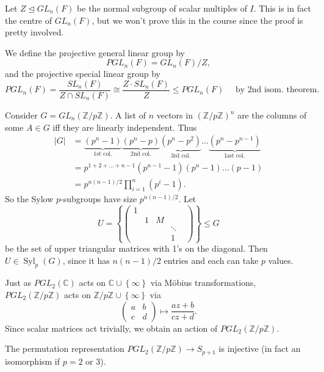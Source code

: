 \documentclass[a4paper]{scrartcl}
\begin{document}
Let $Z \unlhd GL_{n}(F)$ be the normal subgroup of scalar multiples of $I$. This is in fact the centre of $GL_{n}(F)$, but we won't prove this in the course since the proof is pretty involved.
\begin{definition*}
      We define the projective general linear group by \[
      PGL_{n}(F)=GL_{n}(F)/Z
      ,\] and the projective special linear group by \[
          PGL_{n}(F)= \frac{SL_{n}(F)}{Z \cap SL_{n}(F)} \cong \frac{Z \cdot  SL_{n}(F)}{Z} \leq PGL_{n}(F) \quad \text{ by 2nd isom. theorem}
      .\] 
\end{definition*}
\begin{example*}
     Consider $G=GL_{n}(\mathbb{Z}/p\mathbb{Z})$. A list of $n$ vectors in $(\mathbb{Z}/p\mathbb{Z})^{n}$ are the columns of some $A \in G$ iff they are linearly independent. Thus 
     \begin{align*}
          |G|&= \underbrace{(p^{n}-1)}_{\text{1st col.} }\underbrace{(p^{n}-p)}_{\text{2nd col.} } \underbrace{(p^{n}-p^2)}_{\text{3rd col.} } \ldots \underbrace{(p^{n}-p^{n-1})}_{\text{last col.} } \\
          &=p^{1+2+\ldots +n-1} (p^{n-1}-1)(p^{n}-1)\ldots (p-1)\\
          &=p^{n (n-1)/2} \prod_{i=1}^n (p^{i}-1).
     \end{align*}
     So the Sylow $p$-subgroups have size $p^{n (n-1)/2}$. Let \[
     U=\left\{\begin{pmatrix} 1&&&\\ &1&M& \\&&&\ddots & \\ &&&1 \end{pmatrix}\right\} \leq G
     \] be the set of upper triangular matrices with 1's on the diagonal. Then $U \in \operatorname{Syl}_{p}(G)$, since it has $n (n-1)/2$ entries and each can take $p$ values.
\end{example*}
Just as $PGL_{2}(\mathbb{C})$ acts on $\mathbb{C} \cup \left\{ \infty\right\}$ via Möbius transformations, $PGL_{2}(\mathbb{Z}/p\mathbb{Z})$ acts on $\mathbb{Z}/p\mathbb{Z} \cup \left\{ \infty\right\}$ via \[
\begin{pmatrix} a&b\\c&d  \end{pmatrix}\mapsto  \frac{az+b}{cz+d}
.\] Since scalar matrices act trivially, we obtain an action of $PGL_{2}(\mathbb{Z}/p\mathbb{Z})$.
\begin{lemma}\label{permrep}
      The permutation representation $PGL_{2}(\mathbb{Z}/p\mathbb{Z}) \rightarrow S_{p+1}$ is injective (in fact an isomorphism if $p=2$ or $3$).
\end{lemma}
\end{document}
